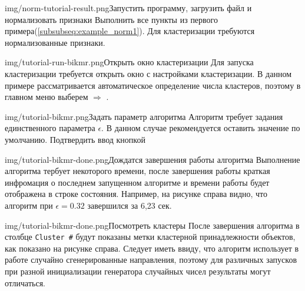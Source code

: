 \documentclass[12pt,tikz]{instruction}
\begin{document}
\begin{steps}
	\begin{ist}{img/norm-tutorial-result.png}{Запустить программу, загрузить файл и нормализовать признаки}
		Выполнить все пункты из первого примера(\ref{subsubseq:example_norm1}). Для кластеризации требуются нормализованные признаки.		
	\end{ist}
	\begin{ist}{img/tutorial-run-bikmr.png}{Открыть окно кластеризации}
		Для запуска кластеризации требуется открыть окно с настройками кластеризации. В данном примере рассматривается автоматическое определение числа кластеров, поэтому в главном меню выберем  $ \Rightarrow $ . 
	\end{ist}
	\begin{ist}{img/tutorial-bikmr.png}{Задать параметр алгоритма}
		Алгоритм \BiKMR требует задания единственного параметра $ \epsilon $. В данном случае рекомендуется оставить значение по умолчанию. Подтвердить ввод кнопкой 
	\end{ist}
	\begin{ist}{img/tutorial-bikmr-done.png}{Дождатся завершения работы алгоритма}
		Выполнение алгоритма тербует некоторого времени, после завершения работы краткая инфромация о последнем запущенном алгоритме и времени работы будет отображена в строке состояния. Например, на рисунке справа видно, что алгоритм \BiKMR при $ \epsilon=0.32 $ завершился за 6,23 сек.
	\end{ist}
	\begin{ist}{img/tutorial-bikmr-done.png}{Посмотреть кластеры}
		После завершения алгоритма в столбце \texttt{Cluster \#} будут показаны метки кластерной принадлежности объектов, как показано на рисунке справа. Следует иметь ввиду, что алгоритм \BiKMR использует в работе случайно сгенерированные направления, поэтому для различных запусков при разной инициализации генератора случайных чисел результаты могут отличаться.
	\end{ist}
	

\end{steps}
\end{document}
